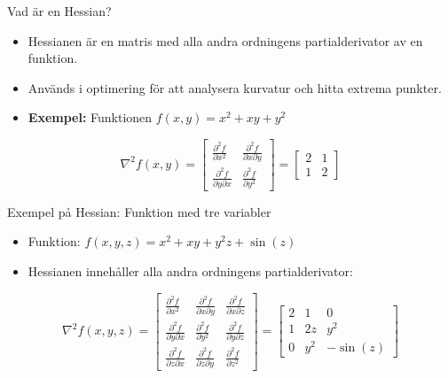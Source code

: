 \documentclass[10pt,english]{beamer}
\begin{document}
\begin{frame}{Vad är en Hessian?}
  \begin{itemize}
    \item Hessianen är en matris med alla andra ordningens partialderivator av en funktion.
    \item Används i optimering för att analysera kurvatur och hitta extrema punkter.
    \item \textbf{Exempel:} Funktionen \( f(x, y) = x^2 + xy + y^2 \)
  \end{itemize}
  \[
  \nabla^2 f(x, y) =
  \begin{bmatrix}
    \frac{\partial^2 f}{\partial x^2} & \frac{\partial^2 f}{\partial x \partial y} \\
    \frac{\partial^2 f}{\partial y \partial x} & \frac{\partial^2 f}{\partial y^2}
  \end{bmatrix}
  =
  \begin{bmatrix}
    2 & 1 \\
    1 & 2
  \end{bmatrix}
  \]
\end{frame}

\begin{frame}{Exempel på Hessian: Funktion med tre variabler}
  \begin{itemize}
    \item Funktion: \( f(x, y, z) = x^2 + xy + y^2z + \sin(z) \)
    \item Hessianen innehåller alla andra ordningens partialderivator:
  \end{itemize}
  \[
  \nabla^2 f(x, y, z) =
  \begin{bmatrix}
    \frac{\partial^2 f}{\partial x^2} & \frac{\partial^2 f}{\partial x \partial y} & \frac{\partial^2 f}{\partial x \partial z} \\
    \frac{\partial^2 f}{\partial y \partial x} & \frac{\partial^2 f}{\partial y^2} & \frac{\partial^2 f}{\partial y \partial z} \\
    \frac{\partial^2 f}{\partial z \partial x} & \frac{\partial^2 f}{\partial z \partial y} & \frac{\partial^2 f}{\partial z^2}
  \end{bmatrix}
  =
  \begin{bmatrix}
    2 & 1 & 0 \\
    1 & 2z & y^2 \\
    0 & y^2 & -\sin(z)
  \end{bmatrix}
  \]
\end{frame}
\end{document}

